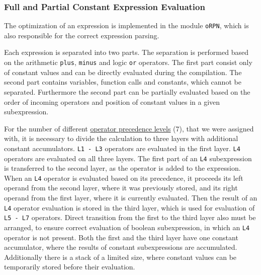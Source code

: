 \documentclass[12pt]{article}
\begin{document}
\subsubsection{Full and Partial Constant Expression Evaluation}
The optimization of an expression is implemented in the module \texttt{oRPN}, which is also responsible for the correct expression parsing. \par
Each expression is separated into two parts. The separation is performed based on the arithmetic \texttt{plus}, \texttt{minus} and logic \texttt{or} operators. The first part consist only of constant values and can be directly evaluated during the compilation. The second part contains variables, function calls and constants, which cannot be separated. Furthermore the second part can be partially evaluated based on the order of incoming operators and position of constant values in a given subexpression. \par
For the number of different \hyperref[sec:prectable]{operator precedence levels} (7), that we were assigned with, it is necessary to divide the calculation to three layers with additional constant accumulators. \texttt{L1\,-\,L3} operators are evaluated in the first layer. \texttt{L4} operators are evaluated on all three layers. The first part of an \texttt{L4} subexpression is transferred to the second layer, as the operator is added to the expression. When an \texttt{L4} operator is evaluated based on its precedence, it proceeds its left operand from the second layer, where it was previously stored, and its right operand from the first layer, where it is currently evaluated. Then the result of an \texttt{L4} operator evaluation is stored in the third layer, which is used for evaluation of \texttt{L5 - L7} operators. Direct transition from the first to the third layer also must be arranged, to ensure correct evaluation of boolean subexpression, in which an \texttt{L4} operator is not present. Both the first and the third layer have one constant accumulator, where the results of constant subexpressions are accumulated. Additionally there is a stack of a limited size, where constant values can be temporarily stored before their evaluation.
\end{document}
